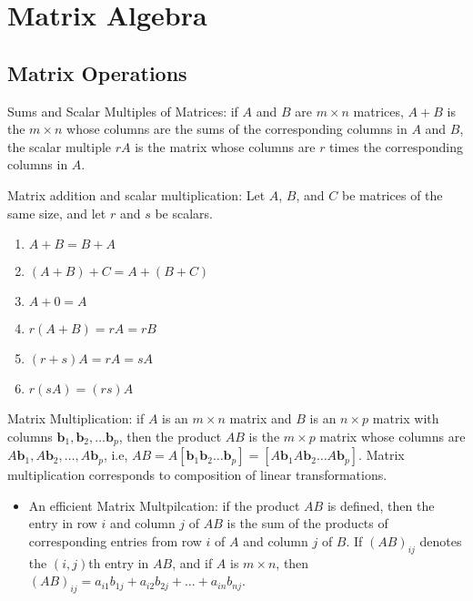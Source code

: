 \documentclass[../linalg.tex]{subfiles}
\begin{document}
\chapter{Matrix Algebra}
\section{Matrix Operations}
Sums and Scalar Multiples of Matrices: if $A$ and $B$ are $m\times n$ matrices, $A+B$ is the $m\times n$ whose columns are the sums of the corresponding columns in $A$ and $B$, the scalar multiple $rA$ is the matrix whose columns are $r$ times the corresponding columns in $A$.

\begin{theorem}
    Matrix addition and scalar multiplication: Let $A$, $B$, and $C$ be matrices of the same size, and let $r$ and $s$ be scalars.
    \begin{enumerate}
        \item $A+B=B+A$
        \item $(A+B)+C=A+(B+C)$
        \item $A+0=A$
        \item $r(A+B)=rA=rB$
        \item $(r+s)A=rA=sA$
        \item $r(sA)=(rs)A$
    \end{enumerate}
\end{theorem}

Matrix Multiplication: if $A$ is an $m\times n$ matrix and $B$ is an $n\times p$ matrix with columns $\textbf{b}_1,\textbf{b}_2,\dots \textbf{b}_p$, then the product $AB$ is the $m\times p$ matrix 
whose columns are $A\textbf{b}_1,A\textbf{b}_2,\dots,A\textbf{b}_p$, i.e, $AB=A[\textbf{b}_1 \textbf{b}_2 \dots \textbf{b}_p] = [A\textbf{b}_1 A\textbf{b}_2 \dots A\textbf{b}_p]$. 
Matrix multiplication corresponds to composition of linear transformations.
\begin{itemize}
    \item An efficient Matrix Multpilcation: if the product $AB$ is defined, then the entry in row $i$ and column $j$ of $AB$ is the sum of the products of corresponding entries from row $i$ of $A$ and column $j$ of $B$. If $(AB)_{ij}$ denotes the $(i,j)$th entry in $AB$, and if $A$ is $m\times n$, then $(AB)_{ij}=a_{i1}b_{1j}+a_{i2}b_{2j}+\dots +a_{in}b_{nj}$.
\end{itemize}
\end{document}
